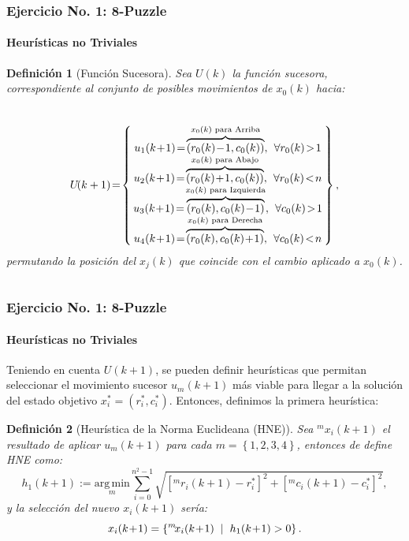 \documentclass[aspectratio=169]{beamer}
\newtheorem{definicion}{Definici\'on}
\begin{document}
\begin{frame}
\frametitle{Ejercicio No. 1: 8-Puzzle}
\framesubtitle{Heurísticas no Triviales}
\begin{definicion}[Función Sucesora]
Sea $U(k)$ la función sucesora, correspondiente al conjunto de posibles movimientos de $x_0(k)$ hacia:
\begin{columns}
\vspace{-.3cm}\begin{equation*}
U\!(k+1) \!=\! \left\{\begin{array}{c}
\!\!u_1(k\!+\!1) \!=\! \overbrace{\left(r_0(k)\!-\!1,c_0(k)\right)}^{x_0(k)\text{ para Arriba}}, \hspace{.15cm} \forall r_0(k)\!>\!1\!\! \\
\!\!u_2(k\!+\!1) \!=\! \overbrace{\left(r_0(k)\!+\!1,c_0(k)\right)}^{x_0(k)\text{ para Abajo}}, \hspace{.15cm} \forall r_0(k)\!<\!n\!\! \\
\!\!u_3(k\!+\!1) \!=\! \overbrace{\left(r_0(k),c_0(k)\!-\!1\right)}^{x_0(k)\text{ para Izquierda}}, \hspace{.15cm} \forall c_0(k)\!>\!1\!\! \\
\!\!u_4(k\!+\!1) \!=\! \overbrace{\left(r_0(k),c_0(k)\!+\!1\right)}^{x_0(k)\text{ para Derecha}}, \hspace{.15cm} \forall c_0(k)\!<\!n\!\!
\end{array}\right\},
\end{equation*}
permutando la posición del $x_j(k)$ que coincide con el cambio aplicado a $x_0(k)$.
\end{columns}
\end{definicion}
\end{frame}
\begin{frame}
\frametitle{Ejercicio No. 1: 8-Puzzle}
\framesubtitle{Heurísticas no Triviales}
Teniendo en cuenta $U\!(k+1)$, se pueden definir heurísticas que permitan seleccionar el movimiento sucesor $u_m(k\!+\!1)$
más viable para llegar a la solución del estado objetivo $x_i^*\!=\!\left(r_i^*,c_i^*\right)$. Entonces, definimos la primera heurística:
\begin{definicion}[Heurística de la Norma Euclideana (HNE)]
Sea $^m\!x_i(k\!+\!1)$ el resultado de aplicar $u_m(k\!+\!1)$ para cada $m\!=\!\left\{1,2,3,4\right\}$, entonces de define
HNE como:
\begin{equation*}
h_1(k\!+\!1) := \underset{m}{\mathrm{arg\,min}}\sum_{i=0}^{n^2-1}\!\sqrt{\left[^mr_i(k\!+\!1) - r_i^*\right]^2 + \left[^mc_i(k\!+\!1) - c_i^*\right]^2},
\end{equation*}
y la selección del nuevo $x_i(k\!+\!1)$ sería:
\begin{equation*}
x_i(k\!+\!1) = \left\{^m\!x_i(k\!+\!1) \hspace{.2cm} | \hspace{.2cm} h_1(k\!+\!1)>0\right\}.
\end{equation*}
\end{definicion}
\end{frame}
\end{document}

